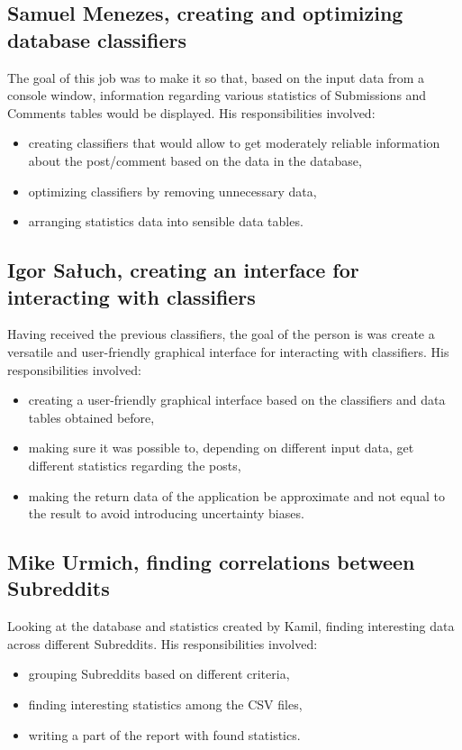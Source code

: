 \documentclass[openany]{article}
\begin{document}
\subsection{Samuel Menezes, creating and optimizing database classifiers}
The goal of this job was to make it so that, based on the input data from a console window, information regarding various statistics of Submissions and Comments tables would be displayed. His responsibilities involved:
\begin{itemize}
	\item creating classifiers that would allow to get moderately reliable information about the post/comment based on the data in the database,
	\item optimizing classifiers by removing unnecessary data,
	\item arranging statistics data into sensible data tables.
\end{itemize}

\subsection{Igor Sałuch, creating an interface for interacting with classifiers}
Having received the previous classifiers, the goal of the person is was create a versatile and user-friendly graphical interface for interacting with classifiers. His responsibilities involved:
\begin{itemize}
	\item creating a user-friendly graphical interface based on the classifiers and data tables obtained before,
	\item making sure it was possible to, depending on different input data, get different statistics regarding the posts,
	\item making the return data of the application be approximate and not equal to the result to avoid introducing uncertainty biases.
\end{itemize}

\subsection{Mike Urmich, finding correlations between Subreddits}
Looking at the database and statistics created by Kamil, finding interesting data across different Subreddits. His responsibilities involved:
\begin{itemize}
	\item grouping Subreddits based on different criteria,
	\item finding interesting statistics among the CSV files,
	\item writing a part of the report with found statistics.
\end{itemize}
\end{document}

